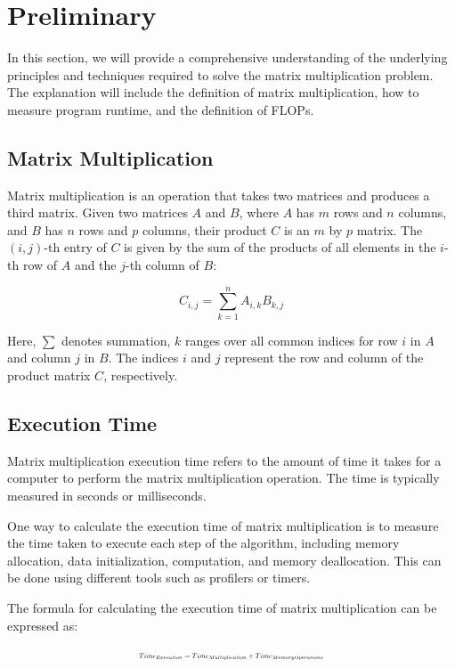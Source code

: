 \documentclass[conference]{IEEEtran}
\begin{document}
	\section{Preliminary}
	In this section, we will provide a comprehensive understanding of the underlying principles and techniques required to solve the matrix multiplication 
	problem. The explanation will include the definition of matrix multiplication, how to measure program runtime, and the definition of FLOPs. 
	\subsection{Matrix Multiplication}
	Matrix multiplication is an operation that takes two matrices and produces a third matrix. Given two matrices $A$ and $B$, where $A$ has $m$ rows and $n$ columns, and $B$ has $n$ rows and $p$ columns, their product $C$ is an $m$ by $p$ matrix. The $(i,j)$-th entry of $C$ is given by the sum of the products of all elements in the $i$-th row of $A$ and the $j$-th column of $B$:
	
	\begin{equation}
		C_{i,j} = \sum_{k=1}^{n} A_{i,k} B_{k,j}
	\end{equation}
	
	
	Here, $\sum$ denotes summation, $k$ ranges over all common indices for row $i$ in $A$ and column $j$ in $B$. The indices $i$ and $j$ represent the row and column of the product matrix $C$, respectively.
	
	\subsection{Execution Time}
	Matrix multiplication execution time refers to the amount of time it takes for a computer to perform the matrix multiplication operation. The time is typically 
	measured in seconds or milliseconds.
	
	One way to calculate the execution time of matrix multiplication is to measure 
	the time taken to execute each step of the algorithm, 
	including memory allocation, data initialization, computation, and memory deallocation. This can be done using different tools such as profilers or timers.
	
	The formula for calculating the execution time of matrix multiplication can be expressed as:
	
	\begin{equation}
		\resizebox{0.44\textwidth}{!}{
			$Time_{Execution} = Time_{Multiplication} + Time_{MemoryOperations}$
		}
	\end{equation}
	
\end{document}
